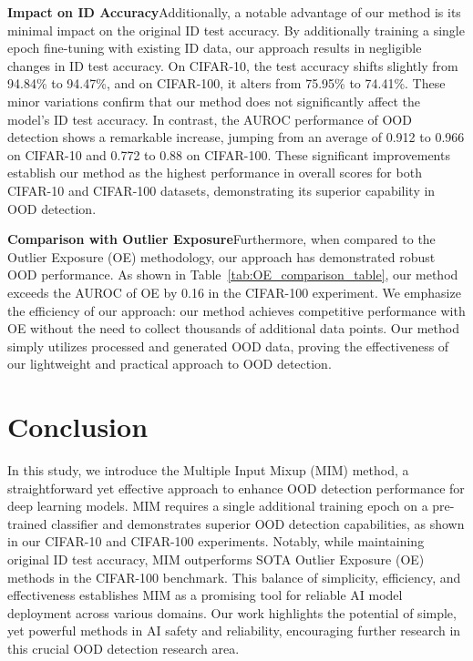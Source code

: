 \documentclass[letterpaper]{article} %
\begin{document}
\smallskip
\noindent\textbf{Impact on ID Accuracy}\indent Additionally, a notable advantage of our method is its minimal impact on the original ID test accuracy. By additionally training a single epoch fine-tuning with existing ID data, our approach results in negligible changes in ID test accuracy. On CIFAR-10, the test accuracy shifts slightly from 94.84\% to 94.47\%, and on CIFAR-100, it alters from 75.95\% to 74.41\%. These minor variations confirm that our method does not significantly affect the model's ID test accuracy. In contrast, the AUROC performance of OOD detection shows a remarkable increase, jumping from an average of 0.912 to 0.966 on CIFAR-10 and 0.772 to 0.88 on CIFAR-100. These significant improvements establish our method as the highest performance in overall scores for both CIFAR-10 and CIFAR-100 datasets, demonstrating its superior capability in OOD detection.

\smallskip
\noindent\textbf{Comparison with Outlier Exposure}\indent Furthermore, when compared to the Outlier Exposure (OE) methodology, our approach has demonstrated robust OOD performance. As shown in Table~\ref{tab:OE_comparison_table}, our method exceeds the AUROC of OE by 0.16 in the CIFAR-100 experiment. We emphasize the efficiency of our approach: our method achieves competitive performance with OE without the need to collect thousands of additional data points. Our method simply utilizes processed and generated OOD data, proving the effectiveness of our lightweight and practical approach to OOD detection.

\vspace{-0.1cm}
\section{Conclusion}
In this study, we introduce the Multiple Input Mixup (MIM) method, a straightforward yet effective approach to enhance OOD detection performance for deep learning models. MIM requires a single additional training epoch on a pre-trained classifier and demonstrates superior OOD detection capabilities, as shown in our CIFAR-10 and CIFAR-100 experiments. Notably, while maintaining original ID test accuracy, MIM outperforms SOTA Outlier Exposure (OE) methods in the CIFAR-100 benchmark. This balance of simplicity, efficiency, and effectiveness establishes MIM as a promising tool for reliable AI model deployment across various domains. Our work highlights the potential of simple, yet powerful methods in AI safety and reliability, encouraging further research in this crucial OOD detection research area.
\vspace{-0.2cm}
\end{document}
